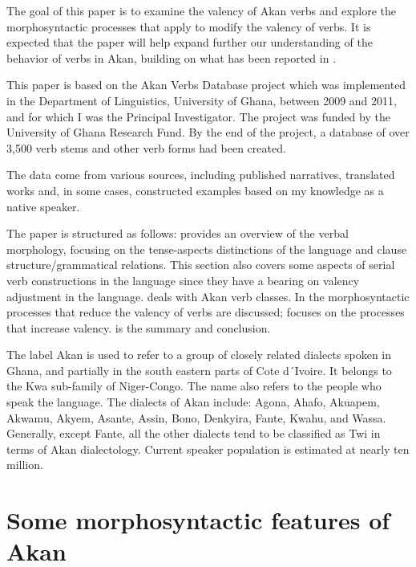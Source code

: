 \documentclass[output=paper]{langsci/langscibook}
\begin{document}
The goal of this paper is to examine the valency of Akan verbs and explore the morphosyntactic processes that apply to modify the valency of verbs. It is expected that the paper will help expand further our understanding of the behavior of verbs in Akan, building on what has been reported in \citet{osam2008a}. 

This paper is based on the Akan Verbs Database project which was implemented in the Department of Linguistics, University of Ghana, between 2009 and 2011, and for which I was the Principal Investigator. The project was funded by the University of Ghana Research Fund. By the end of the project, a database of over 3,500 verb stems and other verb forms had been created.

The data come from various sources, including published narratives, translated works and, in some cases, constructed examples based on my knowledge as a native speaker.

The paper is structured as follows:  provides an overview of the verbal morphology, focusing on the tense-aspects distinctions of the language and clause structure/grammatical relations. This section also covers some aspects of serial verb constructions in the language since they have a bearing on valency adjustment in the language.  deals with Akan verb classes. In  the morphosyntactic processes that reduce the valency of verbs are discussed;  focuses on the processes that increase valency.  is the summary and conclusion. 

The label Akan is used to refer to a group of closely related dialects spoken in Ghana, and partially in the south eastern parts of Cote d´Ivoire. It belongs to the Kwa sub-family of Niger-Congo. The name also refers to the people who speak the language. The dialects of Akan include: Agona, Ahafo, Akuapem, Akwamu, Akyem, Asante, Assin, Bono, Denkyira, Fante, Kwahu, and Wassa. Generally, except Fante, all the other dialects tend to be classified as Twi in terms of Akan dialectology. Current speaker population is estimated at nearly ten million.

\section{Some morphosyntactic features of Akan}\label{§2:morphosyntactic.osam}
\end{document}
